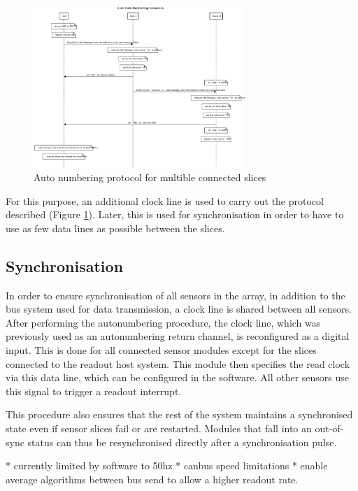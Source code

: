 \documentclass[conference]{IEEEtran}
\begin{document}
\begin{figure}[htbp]
\centerline{\includegraphics[width=8cm]{anp.png}}
\caption{Auto numbering protocol for multible connected slices}
\label{anp_fig}
\end{figure}

For this purpose, an additional clock line is used to carry out the protocol described (Figure \ref{anp_fig}).
Later, this is used for synchronisation in order to have to use as few data lines as possible between the slices.

    


\subsection{Synchronisation}

In order to ensure synchronisation of all sensors in the array, in addition to the bus system used for data transmission, a clock line is shared between all sensors.
After performing the autonumbering procedure, the clock line, which was previously used as an autonumbering return channel, is reconfigured as a digital input.
This is done for all connected sensor modules except for the slices connected to the readout host system.
This module then specifies the read clock via this data line, which can be configured in the software.
All other sensors use this signal to trigger a readout interrupt.

This procedure also ensures that the rest of the system maintains a synchronised state even if sensor slices fail or are restarted.
Modules that fall into an out-of-sync status can thus be resynchronised directly after a synchronisation pulse.


* currently limited by software to 50hz
* canbus speed limitations
* enable average algorithms between bus send to allow a higher readout rate.
\end{document}
